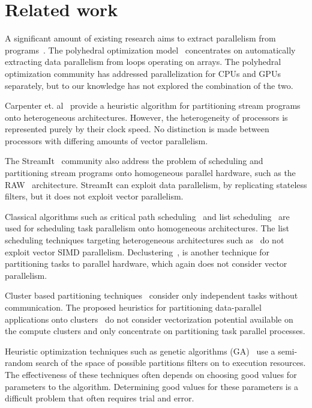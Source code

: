 \section{Related work}
\label{sec:related-work}

A significant amount of existing research aims to extract parallelism
from programs~\cite{mgri98,jdon06,mgor06,gsih93,pcar09}. The
polyhedral optimization model~\cite{mgri98} concentrates on
automatically extracting data parallelism from loops operating on
arrays. The polyhedral optimization community has addressed
parallelization for CPUs and GPUs separately, but to our knowledge has
not explored the combination of the two.

Carpenter et. al~\cite{pcar09} provide a heuristic algorithm for
partitioning stream programs onto heterogeneous architectures.
However, the heterogeneity of processors is represented purely by
their clock speed. No distinction is made between processors with
differing amounts of vector parallelism.

The StreamIt~\cite{Thies2009} community also address the problem of
scheduling and partitioning stream programs onto homogeneous parallel
hardware, such as the RAW~\cite{ewai97} architecture. StreamIt can
exploit data parallelism, by replicating stateless filters, but it
does not exploit vector parallelism.

Classical algorithms such as critical path
scheduling~\cite{Kohler1975} and list scheduling~\cite{atho74}
are used for scheduling task parallelism onto homogeneous
architectures. The list scheduling techniques targeting heterogeneous
architectures such as~\cite{htop02} do not exploit vector SIMD
parallelism. Declustering~\cite{gsih93}, is another technique for
partitioning tasks to parallel hardware, which again does not consider
vector parallelism.

Cluster based partitioning techniques~\cite{mmah99,adou04,tbra01}
consider only independent tasks without communication. The proposed
heuristics for partitioning data-parallel applications onto
clusters~\cite{ssan05,skum02} do not consider vectorization potential
available on the compute clusters and only concentrate on partitioning
task parallel processes.

Heuristic optimization techniques such as genetic algorithms
(GA)~\cite{265940,shroff1996genetic,singh1995mapping,wang1996genetic}
use a semi-random search of the space of possible partitions filters on to
execution resources. The effectiveness of these techniques often
depends on choosing good values for parameters to the algorithm. Determining
good values for these parameters is a difficult problem that often requires
trial and error.


